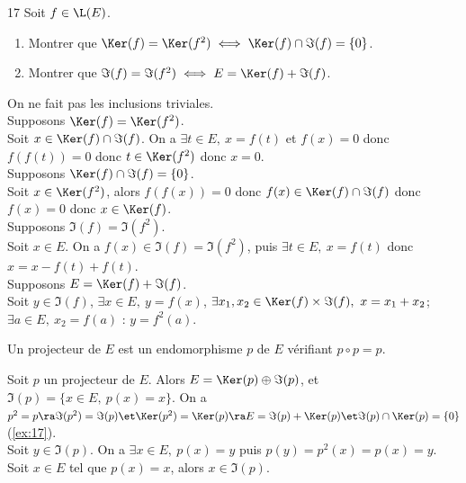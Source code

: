 \documentclass[11pt]{article}
\begin{document}
\begin{ex}{}{17}
    Soit $f\in\L(E)$.
    \begin{enumerate}
        \item Montrer que $\Ker(f)=\Ker(f^2)\iff\Ker(f)\cap\Im(f)=\{0\}$.
        \item Montrer que $\Im(f)=\Im(f^2)\iff E=\Ker(f)+\Im(f)$.
    \end{enumerate}
    \tcblower
    On ne fait pas les inclusions triviales.\\
     Supposons $\Ker(f)=\Ker(f^2)$.\\
    \boxed{\subset} Soit $x\in\Ker(f)\cap\Im(f)$. On a $\exists t \in E, ~ x=f(t)$ et $f(x)=0$ donc $f(f(t))=0$ donc $t\in\Ker(f^2)$ donc $x=0$.\\
     Supposons $\Ker(f)\cap\Im(f)=\{0\}$.\\
    \boxed{\supset} Soit $x\in\Ker(f^2)$, alors $f(f(x))=0$ donc $f(x)\in\Ker(f)\cap\Im(f)$ donc $f(x)=0$ donc $x\in\Ker(f)$.\\
     Supposons $\Im(f)=\Im(f^2)$.\\
    \boxed{\subset} Soit $x\in E$. On a $f(x)\in\Im(f)=\Im(f^2)$, puis $\exists t \in E, ~ x=f(t)$ donc $x=x-f(t)+f(t)$.\\
     Supposons $E=\Ker(f)+\Im(f)$.\\
    \boxed{\subset} Soit $y\in\Im(f)$, $\exists x \in E, ~ y=f(x)$, $\exists x_1,x_2\in\Ker(f)\times\Im(f), ~ x=x_1+x_2$; $\exists a \in E, ~ x_2 = f(a)$ : $y=f^2(a)$. 
\end{ex}

\vspace*{-0.9cm}

\begin{defi}{}{}
    Un projecteur de $E$ est un endomorphisme $p$ de $E$ vérifiant $p\circ p = p$.
\end{defi}

\vspace*{-0.9cm}

\begin{prop}{}{}
    Soit $p$ un projecteur de $E$. Alors $E=\Ker(p)\oplus\Im(p)$, et $\Im(p)=\{x\in E, ~ p(x)=x\}$.
    \tcblower
    On a $p^2=p\ra\Im(p^2)=\Im(p)\et\Ker(p^2)=\Ker(p)\ra E=\Im(p)+\Ker(p)\et\Im(p)\cap\Ker(p)=\{0\}$ (\ref{ex:17}).\\
    \boxed{\subset} Soit $y\in\Im(p)$. On a $\exists x\in E, ~ p(x)=y$ puis $p(y)=p^2(x)=p(x)=y$.\\
    \boxed{\supset} Soit $x\in E$ tel que $p(x)=x$, alors $x\in\Im(p)$.
\end{prop}
\end{document}
